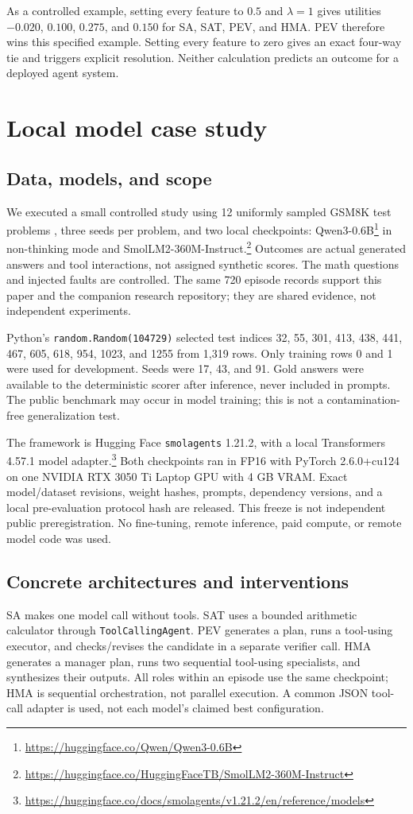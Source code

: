 \documentclass[11pt]{article}
\begin{document}
As a controlled example, setting every feature to $0.5$ and $\lambda=1$ gives utilities $-0.020$, $0.100$, $0.275$, and $0.150$ for SA, SAT, PEV, and HMA. PEV therefore wins this specified example. Setting every feature to zero gives an exact four-way tie and triggers explicit resolution. Neither calculation predicts an outcome for a deployed agent system.


\section{Local model case study}\label{sec:empirical}
\subsection{Data, models, and scope}
We executed a small controlled study using 12 uniformly sampled GSM8K test problems \cite{cobbe2021gsm8k}, three seeds per problem, and two local checkpoints: Qwen3-0.6B\footnote{\url{https://huggingface.co/Qwen/Qwen3-0.6B}} in non-thinking mode and SmolLM2-360M-Instruct.\footnote{\url{https://huggingface.co/HuggingFaceTB/SmolLM2-360M-Instruct}} Outcomes are actual generated answers and tool interactions, not assigned synthetic scores. The math questions and injected faults are controlled. The same 720 episode records support this paper and the companion research repository; they are shared evidence, not independent experiments.

Python's \texttt{random.Random(104729)} selected test indices 32, 55, 301, 413, 438, 441, 467, 605, 618, 954, 1023, and 1255 from 1,319 rows. Only training rows 0 and 1 were used for development. Seeds were 17, 43, and 91. Gold answers were available to the deterministic scorer after inference, never included in prompts. The public benchmark may occur in model training; this is not a contamination-free generalization test.

The framework is Hugging Face \texttt{smolagents} 1.21.2, with a local Transformers 4.57.1 model adapter.\footnote{\url{https://huggingface.co/docs/smolagents/v1.21.2/en/reference/models}} Both checkpoints ran in FP16 with PyTorch 2.6.0+cu124 on one NVIDIA RTX 3050 Ti Laptop GPU with 4 GB VRAM. Exact model/dataset revisions, weight hashes, prompts, dependency versions, and a local pre-evaluation protocol hash are released. This freeze is not independent public preregistration. No fine-tuning, remote inference, paid compute, or remote model code was used.

\subsection{Concrete architectures and interventions}
SA makes one model call without tools. SAT uses a bounded arithmetic calculator through \texttt{ToolCallingAgent}. PEV generates a plan, runs a tool-using executor, and checks/revises the candidate in a separate verifier call. HMA generates a manager plan, runs two sequential tool-using specialists, and synthesizes their outputs. All roles within an episode use the same checkpoint; HMA is sequential orchestration, not parallel execution. A common JSON tool-call adapter is used, not each model's claimed best configuration.
\end{document}
